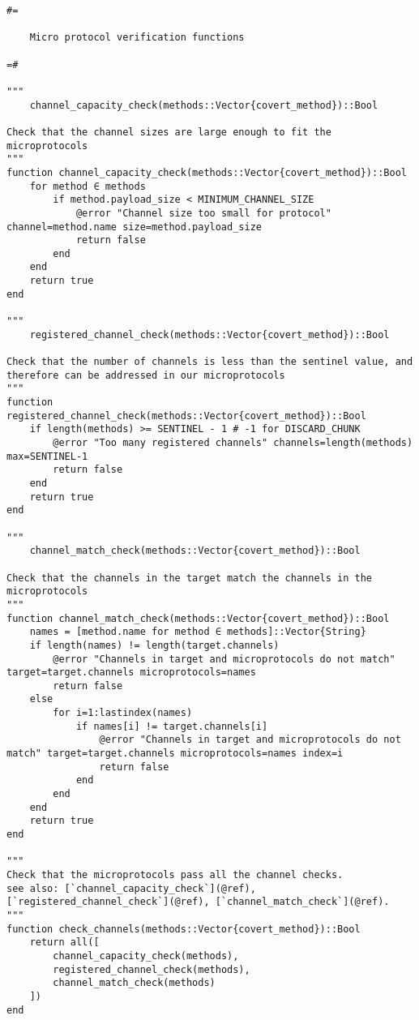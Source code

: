 \begin{lstlisting}[language=JuliaLocal, style=julia]
#=

    Micro protocol verification functions

=#

"""
    channel_capacity_check(methods::Vector{covert_method})::Bool

Check that the channel sizes are large enough to fit the microprotocols
"""
function channel_capacity_check(methods::Vector{covert_method})::Bool
    for method ∈ methods
        if method.payload_size < MINIMUM_CHANNEL_SIZE
            @error "Channel size too small for protocol" channel=method.name size=method.payload_size
            return false
        end
    end
    return true
end

"""
    registered_channel_check(methods::Vector{covert_method})::Bool

Check that the number of channels is less than the sentinel value, and therefore can be addressed in our microprotocols
"""
function registered_channel_check(methods::Vector{covert_method})::Bool
    if length(methods) >= SENTINEL - 1 # -1 for DISCARD_CHUNK
        @error "Too many registered channels" channels=length(methods) max=SENTINEL-1
        return false
    end
    return true
end

"""
    channel_match_check(methods::Vector{covert_method})::Bool

Check that the channels in the target match the channels in the microprotocols
"""
function channel_match_check(methods::Vector{covert_method})::Bool
    names = [method.name for method ∈ methods]::Vector{String}
    if length(names) != length(target.channels)
        @error "Channels in target and microprotocols do not match" target=target.channels microprotocols=names
        return false
    else
        for i=1:lastindex(names)
            if names[i] != target.channels[i]
                @error "Channels in target and microprotocols do not match" target=target.channels microprotocols=names index=i
                return false
            end
        end
    end
    return true
end

"""
Check that the microprotocols pass all the channel checks.
see also: [`channel_capacity_check`](@ref), [`registered_channel_check`](@ref), [`channel_match_check`](@ref).
"""
function check_channels(methods::Vector{covert_method})::Bool
    return all([
        channel_capacity_check(methods),
        registered_channel_check(methods),
        channel_match_check(methods)
    ])
end
\end{lstlisting}
